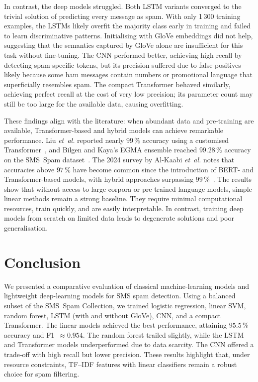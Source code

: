 \documentclass[conference]{IEEEtran}
\begin{document}
In contrast, the deep models struggled. Both LSTM variants converged to the trivial solution of predicting every message as spam. With only 1\,300 training examples, the LSTMs likely overfit the majority class early in training and failed to learn discriminative patterns. Initialising with GloVe embeddings did not help, suggesting that the semantics captured by GloVe alone are insufficient for this task without fine-tuning. The CNN performed better, achieving high recall by detecting spam-specific tokens, but its precision suffered due to false positives---likely because some ham messages contain numbers or promotional language that superficially resembles spam. The compact Transformer behaved similarly, achieving perfect recall at the cost of very low precision; its parameter count may still be too large for the available data, causing overfitting.

These findings align with the literature: when abundant data and pre-training are available, Transformer-based and hybrid models can achieve remarkable performance. Liu \emph{et~al.} reported nearly $99\,\%$ accuracy using a customised Transformer~\cite{liu2021}, and Bilgen and Kaya's EGMA ensemble reached $99.28\,\%$ accuracy on the SMS~Spam dataset~\cite{bilgen2024}. The 2024 survey by Al-Kaabi \emph{et~al.} notes that accuracies above $97\,\%$ have become common since the introduction of BERT- and Transformer-based models, with hybrid approaches surpassing $99\,\%$~\cite{alkaabi2024}. The results show that without access to large corpora or pre-trained language models, simple linear methods remain a strong baseline. They require minimal computational resources, train quickly, and are easily interpretable. In contrast, training deep models from scratch on limited data leads to degenerate solutions and poor generalisation.

\section{Conclusion}

We presented a comparative evaluation of classical machine-learning models and lightweight deep-learning models for SMS spam detection. Using a balanced subset of the SMS~Spam Collection, we trained logistic regression, linear SVM, random forest, LSTM (with and without GloVe), CNN, and a compact Transformer. The linear models achieved the best performance, attaining $95.5\,\%$ accuracy and F1~$\approx 0.954$. The random forest trailed slightly, while the LSTM and Transformer models underperformed due to data scarcity. The CNN offered a trade-off with high recall but lower precision. These results highlight that, under resource constraints, TF--IDF features with linear classifiers remain a robust choice for spam filtering.
\end{document}
